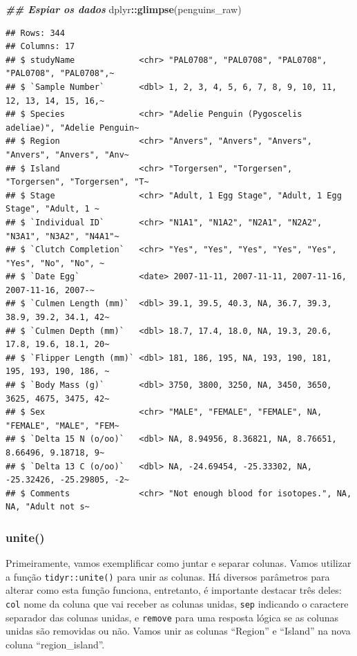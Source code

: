 \documentclass[
]{article}
\newenvironment{Shaded}{\begin{snugshade}}{\end{snugshade}}
\newcommand{\DocumentationTok}[1]{\textcolor[rgb]{0.56,0.35,0.01}{\textbf{\textit{#1}}}}
\newcommand{\FunctionTok}[1]{\textcolor[rgb]{0.13,0.29,0.53}{\textbf{#1}}}
\newcommand{\NormalTok}[1]{#1}
\newcommand{\SpecialCharTok}[1]{\textcolor[rgb]{0.81,0.36,0.00}{\textbf{#1}}}
\begin{document}
\begin{Shaded}
\begin{Highlighting}[]
\DocumentationTok{\#\# Espiar os dados}
\NormalTok{dplyr}\SpecialCharTok{::}\FunctionTok{glimpse}\NormalTok{(penguins\_raw)}
\end{Highlighting}
\end{Shaded}

\begin{verbatim}
## Rows: 344
## Columns: 17
## $ studyName             <chr> "PAL0708", "PAL0708", "PAL0708", "PAL0708", "PAL0708",~
## $ `Sample Number`       <dbl> 1, 2, 3, 4, 5, 6, 7, 8, 9, 10, 11, 12, 13, 14, 15, 16,~
## $ Species               <chr> "Adelie Penguin (Pygoscelis adeliae)", "Adelie Penguin~
## $ Region                <chr> "Anvers", "Anvers", "Anvers", "Anvers", "Anvers", "Anv~
## $ Island                <chr> "Torgersen", "Torgersen", "Torgersen", "Torgersen", "T~
## $ Stage                 <chr> "Adult, 1 Egg Stage", "Adult, 1 Egg Stage", "Adult, 1 ~
## $ `Individual ID`       <chr> "N1A1", "N1A2", "N2A1", "N2A2", "N3A1", "N3A2", "N4A1"~
## $ `Clutch Completion`   <chr> "Yes", "Yes", "Yes", "Yes", "Yes", "Yes", "No", "No", ~
## $ `Date Egg`            <date> 2007-11-11, 2007-11-11, 2007-11-16, 2007-11-16, 2007-~
## $ `Culmen Length (mm)`  <dbl> 39.1, 39.5, 40.3, NA, 36.7, 39.3, 38.9, 39.2, 34.1, 42~
## $ `Culmen Depth (mm)`   <dbl> 18.7, 17.4, 18.0, NA, 19.3, 20.6, 17.8, 19.6, 18.1, 20~
## $ `Flipper Length (mm)` <dbl> 181, 186, 195, NA, 193, 190, 181, 195, 193, 190, 186, ~
## $ `Body Mass (g)`       <dbl> 3750, 3800, 3250, NA, 3450, 3650, 3625, 4675, 3475, 42~
## $ Sex                   <chr> "MALE", "FEMALE", "FEMALE", NA, "FEMALE", "MALE", "FEM~
## $ `Delta 15 N (o/oo)`   <dbl> NA, 8.94956, 8.36821, NA, 8.76651, 8.66496, 9.18718, 9~
## $ `Delta 13 C (o/oo)`   <dbl> NA, -24.69454, -25.33302, NA, -25.32426, -25.29805, -2~
## $ Comments              <chr> "Not enough blood for isotopes.", NA, NA, "Adult not s~
\end{verbatim}

\hypertarget{unite}{%
\subsubsection{unite()}\label{unite}}

Primeiramente, vamos exemplificar como juntar e separar colunas. Vamos utilizar a função \texttt{tidyr::unite()} para unir as colunas. Há diversos parâmetros para alterar como esta função funciona, entretanto, é importante destacar três deles: \texttt{col} nome da coluna que vai receber as colunas unidas, \texttt{sep} indicando o caractere separador das colunas unidas, e \texttt{remove} para uma resposta lógica se as colunas unidas são removidas ou não. Vamos unir as colunas ``Region'' e ``Island'' na nova coluna ``region\_island''.
\end{document}
